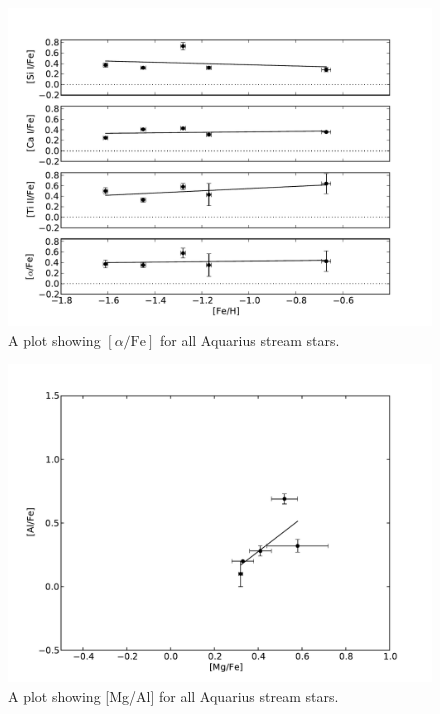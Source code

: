 \documentclass{emulateapj}
\begin{document}
\begin{figure}[h]
	\includegraphics[width=\columnwidth]{./figures/aquarius-alpha-fe.pdf}
	\caption{A plot showing $[\alpha/\mbox{Fe}]$ for all Aquarius stream stars.}
	\label{fig:alpha-fe}
\end{figure}

\begin{figure}[h]
	\includegraphics[width=\columnwidth]{./figures/aquarius-mg-al.pdf}
	\caption{A plot showing [Mg/Al] for all Aquarius stream stars.}
	\label{fig:mg-al}
\end{figure}
\end{document}

